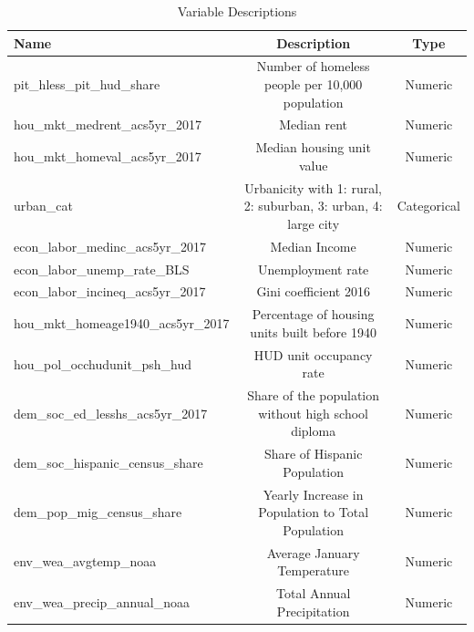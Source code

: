 \documentclass[12pt]{article}
\begin{document}
\begin{table}[htp]
    \centering
    \begin{adjustbox}{max width=\textwidth}
    \Large
    \begin{tabular}{lcc}
        \hline
        \textbf{Name} & \textbf{Description} & \textbf{Type} \\
        \hline
        pit\_hless\_pit\_hud\_share & Number of homeless people per 10,000 population & Numeric \\
        hou\_mkt\_medrent\_acs5yr\_2017 & Median rent & Numeric \\
        hou\_mkt\_homeval\_acs5yr\_2017 & Median housing unit value & Numeric \\
        
        urban\_cat & Urbanicity with 1: rural, 2: suburban, 3: urban, 4: large city & Categorical \\
        
        econ\_labor\_medinc\_acs5yr\_2017 & Median Income & Numeric \\
        
        econ\_labor\_unemp\_rate\_BLS & Unemployment rate & Numeric \\
        
        econ\_labor\_incineq\_acs5yr\_2017 & Gini coefficient 2016 & Numeric \\
        
        hou\_mkt\_homeage1940\_acs5yr\_2017 & Percentage of housing units built before 1940 & Numeric \\
        
        hou\_pol\_occhudunit\_psh\_hud & HUD unit occupancy rate & Numeric \\
        
        dem\_soc\_ed\_lesshs\_acs5yr\_2017 & Share of the population without high school diploma & Numeric \\
        
        dem\_soc\_hispanic\_census\_share & Share of Hispanic Population & Numeric \\
        
        dem\_pop\_mig\_census\_share & Yearly Increase in Population to Total Population & Numeric \\
        
        env\_wea\_avgtemp\_noaa & Average January Temperature & Numeric \\
        
        env\_wea\_precip\_annual\_noaa & Total Annual Precipitation & Numeric \\
        \hline
    \end{tabular}
    \end{adjustbox}
    \caption{Variable Descriptions}
    \label{tab:variables}
\end{table}
\end{document}
